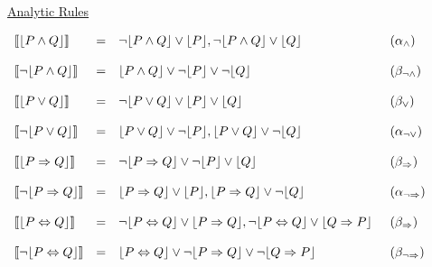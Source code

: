 \begin{figure}[t]
\parbox{\textwidth}
{\small
\underline{Analytic Rules}
\begin{center}
$\begin{array}{lll@{\hspace{0.5cm}}l}
\llbracket\lfloor{}P\land{}Q\rfloor{}\rrbracket & = &
\neg\lfloor{}P\land{}Q\rfloor\lor\lfloor{}P\rfloor,
\neg\lfloor{}P\land{}Q\rfloor\lor\lfloor{}Q\rfloor & (\alpha_\land)\\\\

\llbracket\neg\lfloor{}P\land{}Q\rfloor{}\rrbracket & = &
\lfloor{}P\land{}Q\rfloor\lor\neg\lfloor{}P\rfloor\lor\neg\lfloor{}Q\rfloor &
(\beta_{\neg\land})\\\\

\llbracket{}\lfloor{}P\lor{}Q\rfloor{}\rrbracket & = &
\neg\lfloor{}P\lor{}Q\rfloor\lor\lfloor{}P\rfloor\lor\lfloor{}Q\rfloor &
(\beta_\lor)\\\\

\llbracket\neg\lfloor{}P\lor{}Q\rfloor{}\rrbracket & = &
\lfloor{}P\lor{}Q\rfloor\lor\neg\lfloor{}P\rfloor,
\lfloor{}P\lor{}Q\rfloor\lor\neg\lfloor{}Q\rfloor &
(\alpha_{\neg\lor})\\\\

\llbracket{}\lfloor{}P\Rightarrow{}Q\rfloor{}\rrbracket & = &
\neg\lfloor{}P\Rightarrow{}Q\rfloor\lor\neg\lfloor{}P\rfloor\lor
\lfloor{}Q\rfloor & (\beta_\Rightarrow)\\\\

\llbracket\neg\lfloor{}P\Rightarrow{}Q\rfloor{}\rrbracket & = &
\lfloor{}P\Rightarrow{}Q\rfloor\lor\lfloor{}P\rfloor,
\lfloor{}P\Rightarrow{}Q\rfloor\lor\neg\lfloor{}Q\rfloor &
(\alpha_{\neg\Rightarrow})\\\\

\llbracket{}\lfloor{}P\Leftrightarrow{}Q\rfloor{}\rrbracket & = &
\neg\lfloor{}P\Leftrightarrow{}Q\rfloor\lor\lfloor{}P\Rightarrow{}Q\rfloor,
\neg\lfloor{}P\Leftrightarrow{}Q\rfloor\lor\lfloor{}Q\Rightarrow{}P\rfloor &
(\beta_\Rightarrow)\\\\

\llbracket{}\neg\lfloor{}P\Leftrightarrow{}Q\rfloor{}\rrbracket &
= &
\lfloor{}P\Leftrightarrow{}Q\rfloor\lor\neg\lfloor{}P\Rightarrow{}Q\rfloor\lor
\neg\lfloor{}Q\Rightarrow{}P\rfloor & (\beta_{\neg\Rightarrow})
\end{array}$
\end{center}

}
\end{figure}
